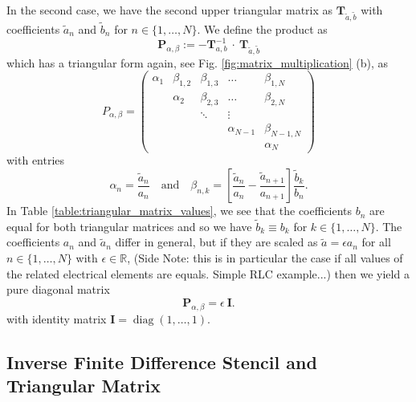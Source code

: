 \documentclass[a4paper, 10pt, twoside, twocolumn]{scrartcl}
\begin{document}
In the second case, we have the second upper triangular matrix as $\mathbf{T}_{\tilde{a},\tilde{b}}$ with coefficients $\tilde{a}_{n}$ and $\tilde{b}_{n}$ for $n\in\{1,\ldots,N\}$. We define the product as 
\begin{equation}
	\mathbf{P}_{\alpha,\beta} := - \mathbf{T}_{a,b}^{-1} ~ \cdot ~ \mathbf{T}_{\tilde{a},\tilde{b}}
\end{equation}
which has a triangular form again, see Fig. \ref{fig:matrix_multiplication} (b), as
\begin{equation}
	P_{\alpha,\beta} = 
	\begin{pmatrix}
		\alpha_{1} & \beta_{1,2} &  \beta_{1,3} & \ldots &   \beta_{1,N} \\
		& \alpha_{2} & \beta_{2,3} &  \ldots &  \beta_{2,N} \\
		& & \ddots & \vdots \\
		& & & \alpha_{N-1} & \beta_{N-1,N} \\
		& & & & \alpha_{N}
	\end{pmatrix}
\end{equation}
with entries
\begin{equation}
	\alpha_{n} = \frac{\tilde{a}_{n}}{a_{n}} \quad \text{and} \quad \beta_{n,k} = \left[\frac{\tilde{a}_{n}}{a_{n}} - \frac{\tilde{a}_{n+1}}{a_{n+1}} \right] \frac{\tilde{b}_{k}}{b_{n}} \text{.}
\end{equation} 
In Table \ref{table:triangular_matrix_values}, we see that the coefficients $b_{n}$ are equal for both triangular matrices and so we have $\tilde{b}_{k} \equiv b_{k}$ for $k \in \{1,\ldots,N\}$. The coefficients $a_{n}$ and $\tilde{a}_{n}$ differ in general, but if they are scaled as  $\tilde{a} = \epsilon a_{n}$ for all $n \in \{1,\ldots,N\}$ with $\epsilon \in \mathbb{R}$, {\color{red} (Side Note: this is in particular the case if all values of the related electrical elements are equals. Simple RLC example...)} then we yield a pure diagonal matrix
\begin{equation*}
	\mathbf{P}_{\alpha,\beta} = \epsilon~\mathbf{I} \text{.}
\end{equation*}
with identity matrix $\mathbf{I} =\operatorname{diag}(1,\ldots,1)$.

\subsection*{Inverse Finite Difference Stencil and Triangular Matrix}
\end{document}
